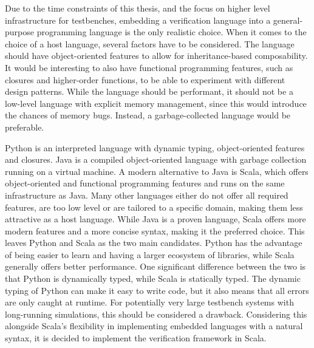 Due to the time constraints of this thesis, and the focus on higher level infrastructure for testbenches, embedding a
verification language into a general-purpose programming language is the only realistic choice. When it comes to the
choice of a host language, several factors have to be considered. The language should have object-oriented features
to allow for inheritance-based composability. It would be interesting to also have functional programming features,
such as closures and higher-order functions, to be able to experiment with different design patterns. While the
language should be performant, it should not be a low-level language with explicit memory management, since this
would introduce the chances of memory bugs. Instead, a garbage-collected language would be preferable.

Python is an interpreted language with dynamic typing, object-oriented features and closures. Java is a compiled
object-oriented language with garbage collection running on a virtual machine. A modern alternative to Java is Scala,
which offers object-oriented and functional programming features and runs on the same infrastructure as Java. Many
other languages either do not offer all required features, are too low level or are tailored to a specific domain,
making them less attractive as a host language. While Java is a proven language, Scala offers more modern features
and a more concise syntax, making it the preferred choice. This leaves Python and Scala as the two main candidates.
Python has the advantage of being easier to learn and having a larger ecosystem of libraries, while Scala generally
offers better performance. One significant difference between the two is that Python is dynamically typed, while
Scala is statically typed. The dynamic typing of Python can make it easy to write code, but it also means that
all errors are only caught at runtime. For potentially very large testbench systems with long-running
simulations, this should be considered a drawback. Considering this alongside Scala's flexibility in implementing
embedded languages with a natural syntax, it is decided to implement the verification framework in Scala.

